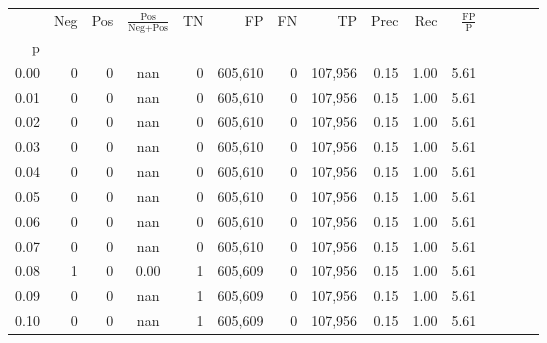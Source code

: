 \begin{tabular}{rrrcrrrrrrrrrrr}
\toprule
{} &     Neg &    Pos & $\frac{\text{Pos}}{\text{Neg}+\text{Pos}}$ &       TN &       FP &       FN &       TP &  Prec &   Rec & $\frac{\text{FP}}{\text{P}}$ \\
p    &         &        &                                            &          &          &          &          &       &       &                              \\
\midrule
0.00 &       0 &      0 &                                        nan &        0 &  605,610 &        0 &  107,956 &  0.15 &  1.00 &                         5.61 \\
0.01 &       0 &      0 &                                        nan &        0 &  605,610 &        0 &  107,956 &  0.15 &  1.00 &                         5.61 \\
0.02 &       0 &      0 &                                        nan &        0 &  605,610 &        0 &  107,956 &  0.15 &  1.00 &                         5.61 \\
0.03 &       0 &      0 &                                        nan &        0 &  605,610 &        0 &  107,956 &  0.15 &  1.00 &                         5.61 \\
0.04 &       0 &      0 &                                        nan &        0 &  605,610 &        0 &  107,956 &  0.15 &  1.00 &                         5.61 \\
0.05 &       0 &      0 &                                        nan &        0 &  605,610 &        0 &  107,956 &  0.15 &  1.00 &                         5.61 \\
0.06 &       0 &      0 &                                        nan &        0 &  605,610 &        0 &  107,956 &  0.15 &  1.00 &                         5.61 \\
0.07 &       0 &      0 &                                        nan &        0 &  605,610 &        0 &  107,956 &  0.15 &  1.00 &                         5.61 \\
0.08 &       1 &      0 &                                       0.00 &        1 &  605,609 &        0 &  107,956 &  0.15 &  1.00 &                         5.61 \\
0.09 &       0 &      0 &                                        nan &        1 &  605,609 &        0 &  107,956 &  0.15 &  1.00 &                         5.61 \\
0.10 &       0 &      0 &                                        nan &        1 &  605,609 &        0 &  107,956 &  0.15 &  1.00 &                         5.61 \\

\end{tabular}

